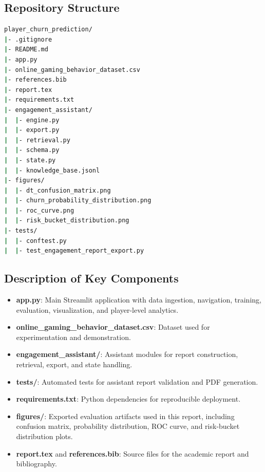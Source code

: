 \documentclass[conference]{IEEEtran}
\begin{document}
\subsection{Repository Structure}
\begin{lstlisting}[language=bash,caption={Current project structure}]
player_churn_prediction/
|- .gitignore
|- README.md
|- app.py
|- online_gaming_behavior_dataset.csv
|- references.bib
|- report.tex
|- requirements.txt
|- engagement_assistant/
|  |- engine.py
|  |- export.py
|  |- retrieval.py
|  |- schema.py
|  |- state.py
|  |- knowledge_base.jsonl
|- figures/
|  |- dt_confusion_matrix.png
|  |- churn_probability_distribution.png
|  |- roc_curve.png
|  |- risk_bucket_distribution.png
|- tests/
|  |- conftest.py
|  |- test_engagement_report_export.py
\end{lstlisting}

\subsection{Description of Key Components}
\begin{itemize}
    \item \textbf{app.py}: Main Streamlit application with data ingestion, navigation, training, evaluation, visualization, and player-level analytics.
    \item \textbf{online\_gaming\_behavior\_dataset.csv}: Dataset used for experimentation and demonstration.
    \item \textbf{engagement\_assistant/}: Assistant modules for report construction, retrieval, export, and state handling.
    \item \textbf{tests/}: Automated tests for assistant report validation and PDF generation.
    \item \textbf{requirements.txt}: Python dependencies for reproducible deployment.
    \item \textbf{figures/}: Exported evaluation artifacts used in this report, including confusion matrix, probability distribution, ROC curve, and risk-bucket distribution plots.
    \item \textbf{report.tex} and \textbf{references.bib}: Source files for the academic report and bibliography.
\end{itemize}
\end{document}
